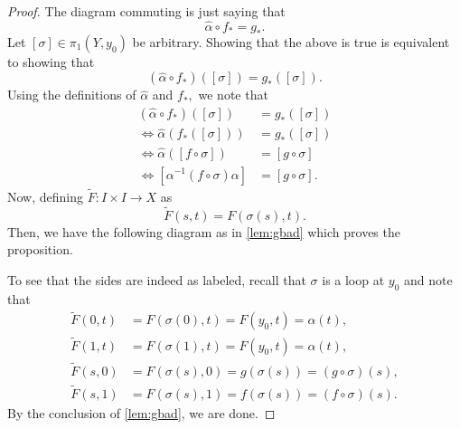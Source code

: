 \documentclass[12pt]{article}
\begin{document}
\begin{proof} 
	The diagram commuting is just saying that
	\begin{equation*} 
		\widehat{\alpha} \circ f_* = g_*.
	\end{equation*}
	Let $[\sigma] \in \pi_1(Y, y_0)$ be arbitrary. Showing that the above is true is equivalent to showing that 
	\begin{equation*} 
		(\widehat{\alpha} \circ f_*)([\sigma]) = g_*([\sigma]).
	\end{equation*}
	Using the definitions of $\widehat{\alpha}$ and $f_*,$ we note that
	\begin{align*} 
		(\widehat{\alpha} \circ f_*)([\sigma]) &= g_*([\sigma])\\
		\iff \widehat{\alpha}(f_*([\sigma])) &= g_*([\sigma])\\
		\iff \widehat{\alpha}([f\circ \sigma]) &= [g\circ \sigma]\\
		\iff [\alpha^{-1}(f\circ \sigma) \alpha] &= [g\circ \sigma].
	\end{align*}
	Now, defining $\tilde{F}:I\times I \to X$ as
	\begin{equation*} 
		\tilde{F}(s, t) = F(\sigma(s), t).
	\end{equation*}
	Then, we have the following diagram as in \cref{lem:gbad} which proves the proposition.
	\begin{center}
	\end{center}
	To see that the sides are indeed as labeled, recall that $\sigma$ is a loop at $y_0$ and note that
	\begin{align*} 
		\tilde{F}(0, t) &= F(\sigma(0), t) = F(y_0, t) = \alpha(t),\\
		\tilde{F}(1, t) &= F(\sigma(1), t) = F(y_0, t) = \alpha(t),\\
		\tilde{F}(s, 0) &= F(\sigma(s), 0) = g(\sigma(s)) = (g\circ \sigma)(s),\\
		\tilde{F}(s, 1) &= F(\sigma(s), 1) = f(\sigma(s)) = (f\circ \sigma)(s).
	\end{align*}
	By the conclusion of \cref{lem:gbad}, we are done.
\end{proof}
\end{document}
